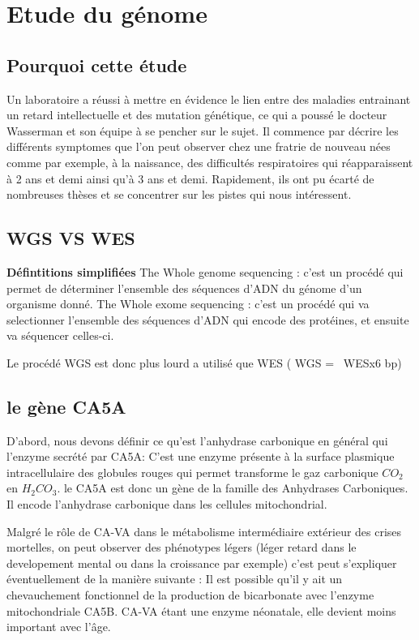 \section{Etude du génome}

\subsection{Pourquoi cette étude}

Un laboratoire a réussi à mettre en évidence le lien entre des maladies entrainant un retard intellectuelle et des mutation génétique, ce qui a poussé le docteur Wasserman et son équipe à se pencher sur le sujet.
Il commence par décrire les différents symptomes que l'on peut observer chez une fratrie de nouveau nées comme par exemple, à la naissance, des difficultés respiratoires qui réapparaissent à 2 ans et demi ainsi qu'à 3 ans et demi.
Rapidement, ils ont pu écarté de nombreuses thèses et se concentrer sur les pistes qui nous intéressent.

\subsection{WGS VS WES}

\textbf{Défintitions simplifiées}
The Whole genome sequencing : c'est un procédé qui permet de déterminer l'ensemble des séquences d'ADN du génome d'un organisme donné.
The Whole exome sequencing : c'est un procédé qui va selectionner l'ensemble des séquences d'ADN qui encode des protéines, et ensuite va séquencer celles-ci.

Le procédé WGS est donc plus lourd a utilisé que WES ( WGS = ~WESx6 bp)

\subsection{le gène CA5A}
D'abord, nous devons définir ce qu'est l'anhydrase carbonique en général qui l'enzyme secrété par CA5A: 
C'est une enzyme présente à la surface plasmique intracellulaire des globules rouges qui permet transforme le gaz carbonique $CO_2$ en $H_2CO_3$.
le CA5A est donc un gène de la famille des Anhydrases Carboniques. Il encode l'anhydrase carbonique dans les cellules mitochondrial.

Malgré le rôle de CA-VA dans le métabolisme intermédiaire extérieur des crises mortelles, on peut observer des phénotypes légers (léger retard dans le developement mental ou dans la croissance par exemple)
c'est peut s'expliquer éventuellement de la manière suivante :
Il est possible qu'il y ait un chevauchement fonctionnel de la production de bicarbonate avec l'enzyme mitochondriale CA5B. CA-VA étant une enzyme néonatale, elle devient moins important avec l'âge.

